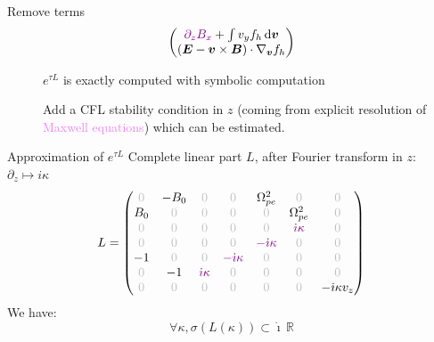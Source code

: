 \documentclass{beamer}
\newcommand{\cmark}{{\color{dgreen}\ding{52}}}
\newcommand{\xmark}{{\color{mred}\ding{55}}}
\newcommand{\Mvb}[1]{\boldsymbol{#1}}
\newcommand{\I}{\dot{\imath}}
\begin{document}
\begin{frame}{Remove terms}
$$\begin{pmatrix}
      \textcolor{violet}{ \partial_zB_x} + \int v_yf_h\dd{\Mvb{v}} \\
      (\Mvb{E}-\Mvb{v}\times\Mvb{B})\cdot\nabla_{\Mvb{v}}f_h
    \end{pmatrix}
  $$
  \begin{description}
    \item[\cmark] $e^{\tau L}$ is exactly computed with symbolic computation
    \item[\xmark] Add a CFL stability condition in $z$ (coming from explicit resolution of \textcolor{violet}{Maxwell equations}) which can be estimated.
  \end{description}
\end{frame}


\begin{frame}{Approximation of $e^{\tau L}$}
  Complete linear part $L$, after Fourier transform in $z$: $\partial_z\mapsto i\kappa$
  $$
    L = \begin{pmatrix}
      \gz & -B_0 & \gz                      &  \gz                      &  \Omega_{pe}^2            & \gz                      & \gz \\ 
      B_0 &  \gz & \gz                      &  \gz                      &  \gz                      & \Omega_{pe}^2            & \gz \\
      \gz &  \gz & \gz                      &  \gz                      &  \gz                      & \color{violet}{\I\kappa} & \gz \\ 
      \gz &  \gz & \gz                      &  \gz                      & \color{violet}{-\I\kappa} & \gz                      & \gz \\ 
      -1  &  \gz & \gz                      & \color{violet}{-\I\kappa} &  \gz                      & \gz                      & \gz \\ 
      \gz & -1   & \color{violet}{\I\kappa} &  \gz                      &  \gz                      & \gz                      & \gz \\ 
      \gz &  \gz & \gz                      &  \gz                      &  \gz                      & \gz                      & -\I\kappa v_z \\ 
    \end{pmatrix}
  $$
  We have:
  $$
    \forall \kappa, \sigma({L(\kappa)})\subset \dot{\imath}\,\mathbb{R}
  $$
\end{frame}
\end{document}
